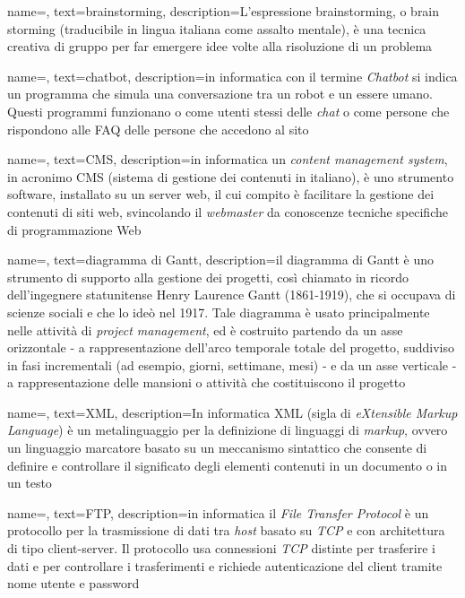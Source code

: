 {
    name=,
    text=brainstorming,
    description={L'espressione brainstorming, o brain storming (traducibile in lingua italiana come assalto mentale), è una tecnica creativa di gruppo per far emergere idee volte alla risoluzione di un problema}
}

{
    name=,
    text=chatbot,
    description={in informatica con il termine \emph{Chatbot} si indica un programma che simula una conversazione tra un robot e un essere umano. Questi programmi funzionano o come utenti stessi delle \emph{chat} o come persone che rispondono alle FAQ delle persone che accedono al sito}
}

{
    name=,
    text=CMS,
    description={in informatica un \emph{content management system}, in acronimo CMS (sistema di gestione dei contenuti in italiano), è uno strumento software, installato su un server web, il cui compito è facilitare la gestione dei contenuti di siti web, svincolando il \emph{webmaster} da conoscenze tecniche specifiche di programmazione Web}
}

{
    name=,
    text=diagramma di Gantt,
    description={il diagramma di Gantt è uno strumento di supporto alla
gestione dei progetti, così chiamato in ricordo dell'ingegnere statunitense Henry
Laurence Gantt (1861-1919), che si occupava di scienze sociali e che lo ideò
nel 1917. Tale diagramma è usato principalmente nelle attività di \emph{project
management}, ed è costruito partendo da un asse orizzontale - a rappresentazione
dell’arco temporale totale del progetto, suddiviso in fasi incrementali (ad esempio,
giorni, settimane, mesi) - e da un asse verticale - a rappresentazione delle mansioni
o attività che costituiscono il progetto}
}

{
    name=,
    text=XML,
    description={In informatica XML (sigla di \emph{eXtensible Markup Language}) è un metalinguaggio per la definizione di linguaggi di \emph{markup}, ovvero un linguaggio marcatore basato su un meccanismo sintattico che consente di definire e controllare il significato degli elementi contenuti in un documento o in un testo}
}

{
    name=,
    text=FTP,
    description={in informatica il \emph{File Transfer Protocol} è un protocollo per la trasmissione di dati tra \emph{host} basato su \emph{TCP} e con architettura di tipo client-server. Il protocollo usa connessioni \emph{TCP} distinte per trasferire i dati e per controllare i trasferimenti e richiede autenticazione del client tramite nome utente e password}
}

